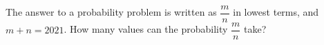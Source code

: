 The answer to a probability problem is written as $\dfrac mn$ in lowest terms, and $m+n=2021$. How many values can the probability $\dfrac mn$ take?
